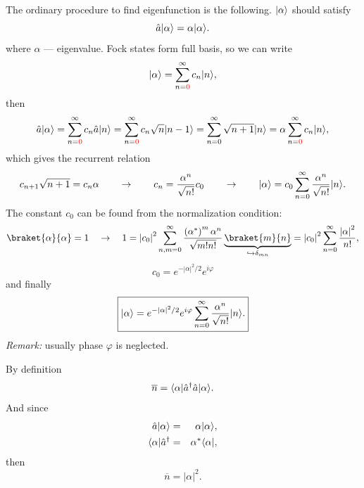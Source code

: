 The ordinary procedure to find eigenfunction is the following. $\lvert\alpha\rangle$ should satisfy
\begin{equation}
	\hat{a} \lvert\alpha\rangle = \alpha \lvert\alpha\rangle.
\end{equation}
where $\alpha$ --- eigenvalue.
Fock states form full basis, so we can write
\begin{equation}
	\lvert\alpha\rangle = \sum_{n={\textcolor{red} 0}}^{\infty} c_n \lvert n\rangle,
\end{equation}
then
\begin{equation}
	\hat{a} \lvert\alpha\rangle = \sum_{n={\textcolor{red} 0}}^{\infty} c_n \hat{a} \lvert n\rangle = \sum_{n={\textcolor{red} 0}}^{\infty} c_n \sqrt{n} \lvert n-1\rangle = \sum_{n=0}^{\infty} \sqrt{n+1} \lvert n\rangle = \alpha \sum_{n={\textcolor{red} 0}}^{\infty} c_n \lvert n\rangle,
\end{equation}
which gives the recurrent relation
\begin{equation}
	c_{n+1} \sqrt{n+1} = c_n \alpha \qquad \to \qquad c_n = \frac{\alpha^n}{\sqrt{n!}} c_0 \qquad \to \qquad \lvert\alpha\rangle = c_0 \sum_{n=0}^{\infty} \frac{\alpha^n}{\sqrt{n!}} \lvert n\rangle.
\end{equation}
The constant $c_0$ can be found from the normalization condition:
\begin{equation}
	\braket{\alpha}{\alpha} = 1 \quad \to \quad 1 = \left|c_0\right|^2 \sum_{n,m = 0}^{\infty} \frac{\left( \alpha^* \right)^m \alpha^n}{\sqrt{m!n!}} \underbrace{\braket{m}{n}}_{\hookrightarrow  \delta_{mn}} = \left|c_0\right|^2 \sum_{n = 0}^{\infty} \frac{\left|\alpha\right|^2}{n!},
\end{equation}
\begin{equation}
	c_0 = e^{- \left|\alpha\right|^2/2} e^{i \varphi}
\end{equation}
and finally
\begin{equation}
	\boxed{\lvert\alpha\rangle = e^{- \left|\alpha\right|^2/2} e^{i \varphi} \sum_{n = 0}^{\infty} \frac{\alpha^n}{\sqrt{n!}} \lvert n\rangle.}
\end{equation}
\textit{Remark:} usually phase $\varphi$ is neglected.

\begin{testexample}
	By definition
	\begin{equation}
	\overline{n} = \langle\alpha\rvert \hat{a}^{\dagger} \hat{a} \lvert\alpha\rangle.
	\end{equation}
	And since
	\begin{eqnarray}
	\hat{a} \lvert\alpha\rangle &=& \alpha \lvert\alpha\rangle, \\
	\langle\alpha\rvert \hat{a}^{\dagger}  &=& \alpha^* \langle\alpha\rvert,
	\end{eqnarray}
	then
	\begin{equation}
	\overline{n} = \left| \alpha \right|^2.
	\end{equation}
\end{testexample}

